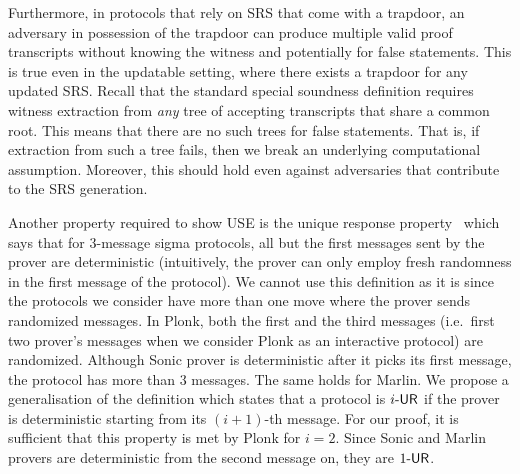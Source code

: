 Furthermore, in protocols that rely on SRS that come with a trapdoor, an adversary in
possession of the trapdoor can produce multiple valid proof transcripts without
knowing the witness and potentially for false statements. This is true even in
the updatable setting, where there exists a trapdoor for any updated SRS. Recall
that the standard special soundness definition requires witness extraction from
\emph{any} tree of accepting transcripts that share a common root. This means
that there are no such trees for false statements.   That
is, if extraction from such a tree fails, then we break an underlying
computational assumption. Moreover, this should hold even against adversaries
that contribute to the SRS generation.

  Another property
required to show USE is the unique response property~\cite{C:Fischlin05} which says
that for $3$-message sigma protocols, all but the first messages sent by the prover are
deterministic (intuitively, the prover can only employ fresh randomness in the first
message of the protocol). We cannot use this definition as it is since the protocols
we consider have more than one move where the prover sends randomized messages. In
Plonk, both the first and the third messages (i.e.~first two prover's messages when
we consider Plonk as an interactive protocol) are randomized. Although Sonic prover
is deterministic after it picks its first message, the protocol has more than $3$
messages. The same holds for Marlin. We propose a generalisation of the definition which
states that a protocol is ${i\text{-}\mathsf{UR}}$ if the prover is deterministic starting from its
$(i + 1)$-th message. For our proof, it is sufficient that this property is met by Plonk
for $i = 2$. Since Sonic and Marlin provers are deterministic from the second message
on, they are ${1\text{-}\mathsf{UR}}$.


